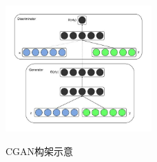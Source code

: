 \begin{figure}[!htb]
  \centering
  \includegraphics[width=0.5\textwidth]{figures/cgan.jpg}\\
  \caption{CGAN构架示意}
  \label{fig:CGAN}
\end{figure}

